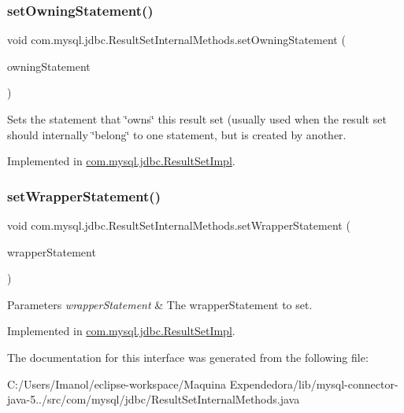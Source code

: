\subsubsection{\texorpdfstring{set\+Owning\+Statement()}{setOwningStatement()}}
{\footnotesize\ttfamily void com.\+mysql.\+jdbc.\+Result\+Set\+Internal\+Methods.\+set\+Owning\+Statement (\begin{DoxyParamCaption}\item[{\mbox{\hyperlink{classcom_1_1mysql_1_1jdbc_1_1_statement_impl}{com.\+mysql.\+jdbc.\+Statement\+Impl}}}]{owning\+Statement }\end{DoxyParamCaption})}

Sets the statement that \char`\"{}owns\char`\"{} this result set (usually used when the result set should internally \char`\"{}belong\char`\"{} to one statement, but is created by another. 

Implemented in \mbox{\hyperlink{classcom_1_1mysql_1_1jdbc_1_1_result_set_impl_ac318c564fa48174a78268750b91bac73}{com.\+mysql.\+jdbc.\+Result\+Set\+Impl}}.

\mbox{\label{interfacecom_1_1mysql_1_1jdbc_1_1_result_set_internal_methods_ac1fc0056e58d1648fa493b97c8a658fc}} 
\subsubsection{\texorpdfstring{set\+Wrapper\+Statement()}{setWrapperStatement()}}
{\footnotesize\ttfamily void com.\+mysql.\+jdbc.\+Result\+Set\+Internal\+Methods.\+set\+Wrapper\+Statement (\begin{DoxyParamCaption}\item[{java.\+sql.\+Statement}]{wrapper\+Statement }\end{DoxyParamCaption})}


\begin{DoxyParams}{Parameters}
{\em wrapper\+Statement} & The wrapper\+Statement to set. \\
\hline
\end{DoxyParams}


Implemented in \mbox{\hyperlink{classcom_1_1mysql_1_1jdbc_1_1_result_set_impl_af945ea2fe5463f6d71b3af855fcf9dd5}{com.\+mysql.\+jdbc.\+Result\+Set\+Impl}}.



The documentation for this interface was generated from the following file\+:\begin{DoxyCompactItemize}
\item 
C\+:/\+Users/\+Imanol/eclipse-\/workspace/\+Maquina Expendedora/lib/mysql-\/connector-\/java-\/5../src/com/mysql/jdbc/Result\+Set\+Internal\+Methods.\+java\end{DoxyCompactItemize}
